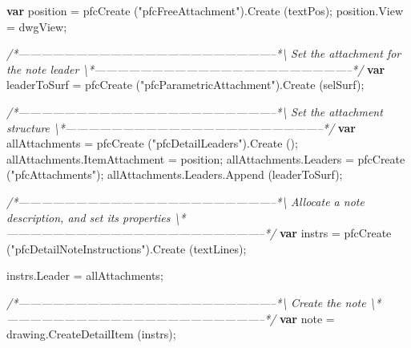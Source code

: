 \documentclass[]{article}
\newenvironment{Shaded}{}{}
\newcommand{\KeywordTok}[1]{\textcolor[rgb]{0.00,0.44,0.13}{\textbf{{#1}}}}
\newcommand{\StringTok}[1]{\textcolor[rgb]{0.25,0.44,0.63}{{#1}}}
\newcommand{\CommentTok}[1]{\textcolor[rgb]{0.38,0.63,0.69}{\textit{{#1}}}}
\newcommand{\OtherTok}[1]{\textcolor[rgb]{0.00,0.44,0.13}{{#1}}}
\newcommand{\FunctionTok}[1]{\textcolor[rgb]{0.02,0.16,0.49}{{#1}}}
\newcommand{\NormalTok}[1]{{#1}}
\begin{document}
\begin{Shaded}
\begin{Highlighting}[]
 \KeywordTok{var} \NormalTok{position = }\FunctionTok{pfcCreate} \NormalTok{(}\StringTok{"pfcFreeAttachment"}\NormalTok{).}\FunctionTok{Create} \NormalTok{(textPos);}
 \OtherTok{position}\NormalTok{.}\FunctionTok{View} \NormalTok{= dwgView;}
 
\CommentTok{/*--------------------------------------------------------------------*\textbackslash{}    }
\CommentTok{  Set the attachment for the note leader}
\CommentTok{\textbackslash{}*--------------------------------------------------------------------*/} 
 \KeywordTok{var} \NormalTok{leaderToSurf = }\FunctionTok{pfcCreate} \NormalTok{(}\StringTok{"pfcParametricAttachment"}\NormalTok{).}\FunctionTok{Create} \NormalTok{(selSurf);}

\CommentTok{/*--------------------------------------------------------------------*\textbackslash{}    }
\CommentTok{  Set the attachment structure}
\CommentTok{\textbackslash{}*--------------------------------------------------------------------*/} 
 \KeywordTok{var} \NormalTok{allAttachments = }\FunctionTok{pfcCreate} \NormalTok{(}\StringTok{"pfcDetailLeaders"}\NormalTok{).}\FunctionTok{Create} \NormalTok{();}
 \OtherTok{allAttachments}\NormalTok{.}\FunctionTok{ItemAttachment} \NormalTok{= position;}
 \OtherTok{allAttachments}\NormalTok{.}\FunctionTok{Leaders} \NormalTok{= }\FunctionTok{pfcCreate} \NormalTok{(}\StringTok{"pfcAttachments"}\NormalTok{);}
 \OtherTok{allAttachments}\NormalTok{.}\OtherTok{Leaders}\NormalTok{.}\FunctionTok{Append} \NormalTok{(leaderToSurf);}
    
\CommentTok{/*--------------------------------------------------------------------*\textbackslash{} }
\CommentTok{  Allocate a note description, and set its properties}
\CommentTok{\textbackslash{}*--------------------------------------------------------------------*/}    
 \KeywordTok{var} \NormalTok{instrs = }\FunctionTok{pfcCreate} \NormalTok{(}\StringTok{"pfcDetailNoteInstructions"}\NormalTok{).}\FunctionTok{Create} \NormalTok{(textLines);}
 
 \OtherTok{instrs}\NormalTok{.}\FunctionTok{Leader} \NormalTok{= allAttachments;}
   
\CommentTok{/*--------------------------------------------------------------------*\textbackslash{}    }
\CommentTok{  Create the note}
\CommentTok{\textbackslash{}*--------------------------------------------------------------------*/}    
 \KeywordTok{var} \NormalTok{note = }\OtherTok{drawing}\NormalTok{.}\FunctionTok{CreateDetailItem} \NormalTok{(instrs);}
 

\end{Highlighting}
\end{Shaded}
\end{document}
